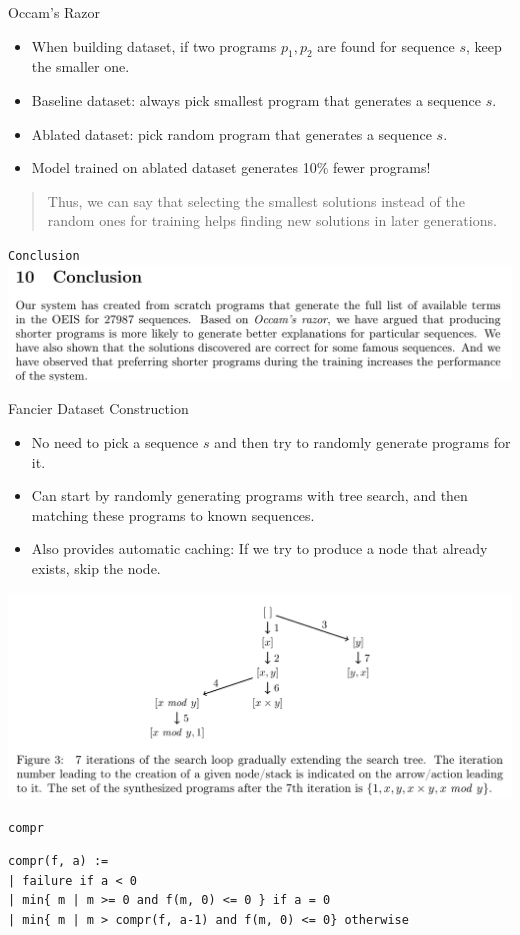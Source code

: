 \documentclass[8pt]{beamer}
\begin{document}
\begin{frame}[fragile]{Occam's Razor}
\begin{itemize}
\item When building dataset, if two programs $p_1, p_2$ are found for sequence $s$, keep the smaller one. \pause
\item Baseline dataset: always pick smallest program that generates a sequence $s$. \pause
\item Ablated dataset: pick random program that generates a sequence $s$.  \pause
\item Model trained on ablated dataset generates 10\% fewer programs! \pause
\end{itemize}
\begin{quote}
Thus, we can say that selecting the smallest solutions instead of the random ones for training
helps finding new solutions in later generations. 
\end{quote}
\end{frame}

\begin{frame}[fragile]{\texttt{Conclusion}}
\includegraphics{conclusion.png}
\end{frame}

\begin{frame}[fragile]{Fancier Dataset Construction}
\begin{itemize}
\item No need to pick a sequence $s$ and then try to randomly generate programs for it. \pause
\item Can start by randomly generating programs with tree search, and then matching these programs to known sequences. \pause
\item Also provides automatic caching: If we try to produce a node that already exists, skip the node. \pause
\end{itemize}
\includegraphics[width=\textwidth]{./tree-1.png} \pause
\end{frame}


\begin{frame}[fragile]{\texttt{compr}}
\begin{verbatim}
compr(f, a) := 
| failure if a < 0 
| min{ m | m >= 0 and f(m, 0) <= 0 } if a = 0
| min{ m | m > compr(f, a-1) and f(m, 0) <= 0} otherwise
\end{verbatim}
\end{frame}
\end{document}
